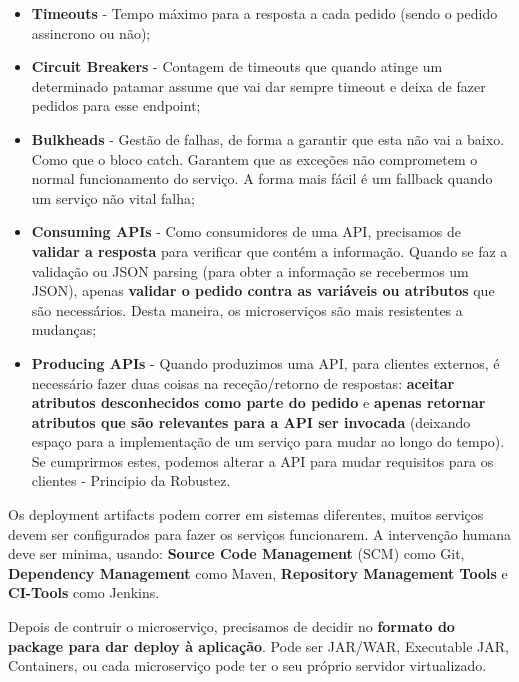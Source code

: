 \documentclass{article}
\begin{document}
\begin{itemize}
  \item \textbf{Timeouts} - Tempo máximo para a resposta a cada pedido (sendo o pedido assincrono ou não);
  \item \textbf{Circuit Breakers} - Contagem de timeouts que quando atinge um determinado patamar assume que vai dar
  sempre timeout e deixa de fazer pedidos para esse endpoint;
  \item \textbf{Bulkheads} - Gestão de falhas, de forma a garantir que
  esta não vai a baixo. Como que o bloco catch. Garantem que as exceções não comprometem o
  normal funcionamento do serviço. A forma mais fácil é um fallback
  quando um serviço não vital falha;
  \item \textbf{Consuming APIs} - Como consumidores de uma API,
  precisamos de \textbf{validar a resposta} para verificar que contém a
  informação. Quando se faz a validação ou JSON parsing (para obter a
  informação se recebermos um JSON), apenas \textbf{validar
  o pedido contra as variáveis ou atributos} que são necessários.
  Desta maneira, os microserviços são mais resistentes a mudanças;
  \item \textbf{Producing APIs} - Quando produzimos uma API,
  para clientes externos, é necessário fazer duas coisas na receção/retorno
  de respostas: \textbf{aceitar atributos desconhecidos como parte
  do pedido} e \textbf{apenas retornar atributos que são relevantes
  para a API ser invocada} (deixando espaço para a implementação
  de um serviço para mudar ao longo do tempo). Se cumprirmos estes,
  podemos alterar a API para mudar requisitos para os clientes -
  Principio da Robustez.
\end{itemize}

Os deployment artifacts podem correr em sistemas diferentes,
muitos serviços devem ser configurados para fazer os serviços funcionarem.
A intervenção humana deve ser minima, usando:
\textbf{Source Code Management} (SCM) como Git, \textbf{Dependency
Management} como Maven, \textbf{Repository Management Tools} e
\textbf{CI-Tools} como Jenkins.

\pagebreak

Depois de contruir o microserviço, precisamos de decidir no
\textbf{formato do package para dar deploy à aplicação}.
Pode ser JAR/WAR, Executable JAR, Containers, ou
cada microserviço pode ter o seu próprio servidor
virtualizado.

\vspace{2mm}
\end{document}
